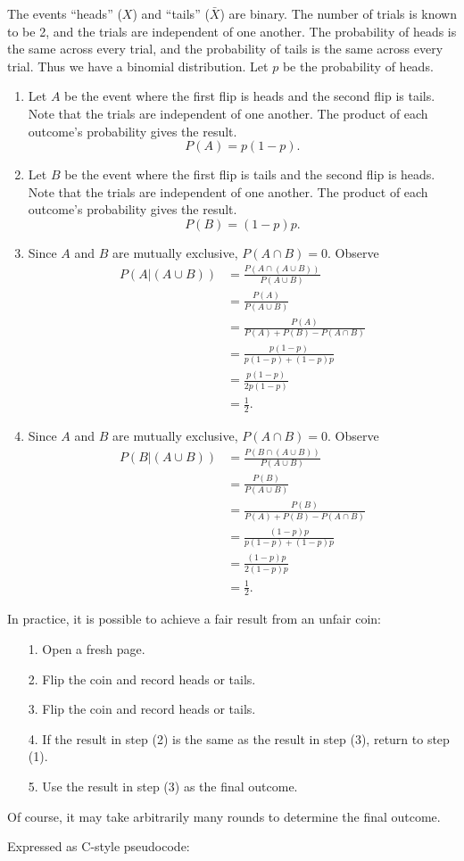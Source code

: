 \documentclass{article}
\theoremstyle{definition}
\begin{document}
\begin{solution}
The events ``heads'' ($X$) and ``tails'' ($\bar{X}$) are binary. The number of trials is known to be 2, and the trials are independent of one another. The probability of heads is the same across every trial, and the probability of tails is the same across every trial. Thus we have a binomial distribution. Let $p$ be the probability of heads.
\begin{enumerate}
\item Let $A$ be the event where the first flip is heads and the second flip is tails. Note that the trials are independent of one another. The product of each outcome's probability gives the result.
\[P(A)=p(1-p).\]
\item Let $B$ be the event where the first flip is tails and the second flip is heads. Note that the trials are independent of one another. The product of each outcome's probability gives the result.
\[P(B)=(1-p)p.\]
\item Since $A$ and $B$ are mutually exclusive, $P(A\cap B)=0$. Observe
\begin{align*}
P(A|(A\cup B))
&=\frac{P(A\cap(A\cup B))}{P(A\cup B)}\\
&=\frac{P(A)}{P(A\cup B)}\\
&=\frac{P(A)}{P(A)+P(B)-P(A\cap B)}\\
&=\frac{p(1-p)}{p(1-p)+(1-p)p}\\
&=\frac{p(1-p)}{2p(1-p)}\\
&=\frac{1}{2}.
\end{align*}
\item Since $A$ and $B$ are mutually exclusive, $P(A\cap B)=0$. Observe
\begin{align*}
P(B|(A\cup B))
&=\frac{P(B\cap(A\cup B))}{P(A\cup B)}\\
&=\frac{P(B)}{P(A\cup B)}\\
&=\frac{P(B)}{P(A)+P(B)-P(A\cap B)}\\
&=\frac{(1-p)p}{p(1-p)+(1-p)p}\\
&=\frac{(1-p)p}{2(1-p)p}\\
&=\frac{1}{2}.
\end{align*}
\end{enumerate}
In practice, it is possible to achieve a fair result from an unfair coin:
\begin{enumerate}
    \item[1.] Open a fresh page.
    \item[2.] Flip the coin and record heads or tails.
    \item[3.] Flip the coin and record heads or tails.
    \item[4.] If the result in step (2) is the same as the result in step (3), return to step (1).
    \item[5.] Use the result in step (3) as the final outcome.
\end{enumerate}
Of course, it may take arbitrarily many rounds to determine the final outcome.

\noindent Expressed as C-style pseudocode:

\end{solution}
\end{document}
